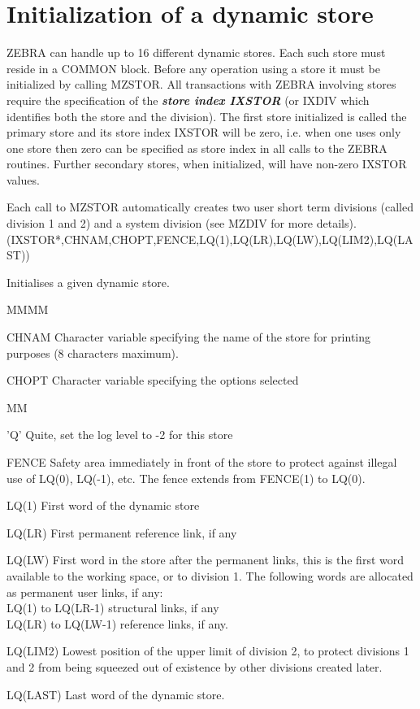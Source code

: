 \section{Initialization of a dynamic store}
\par
ZEBRA can handle up to 16 different dynamic stores. Each such store
must reside in a COMMON block.
Before any operation using a store
it must be initialized by calling MZSTOR.
All transactions with ZEBRA involving stores require the specification
of the
{\bf\it store index IXSTOR}
(or IXDIV which identifies both the store and the division).
The first store initialized is called the primary store and
its store index IXSTOR will be zero, i.e.
when one uses only one store then zero can be specified
as store index in all calls to the ZEBRA routines.
Further secondary stores, when initialized, will have
non-zero IXSTOR values.
\par Each call to MZSTOR automatically creates two user short term
divisions (called division 1 and 2) and a system division (see MZDIV
for more details).
(IXSTOR*,CHNAM,CHOPT,FENCE,LQ(1),LQ(LR),LQ(LW),LQ(LIM2),LQ(LAST))
\par Initialises a given dynamic store.
\Idesc
\begin{DL}{MMMM}
\item[CHNAM]Character variable specifying the name of the store for
printing purposes (8 characters maximum).
\item[CHOPT]Character variable specifying the options selected
\begin{DL}{MM}
\item['Q']Quite, set the log level to -2 for this store
\end{DL}
\item[FENCE]Safety area immediately in front of the store to
protect against illegal use of LQ(0), LQ(-1), etc.
The fence extends from FENCE(1) to LQ(0).
\item[LQ(1)]First word of the dynamic store
\item[LQ(LR)]First permanent reference link, if any
\item[LQ(LW)]First word in the store after the permanent links,
this is the first word available to the working
space, or to division 1. The following words are
allocated as permanent user links, if any:\\
LQ(1)  to LQ(LR-1)  structural links, if any\\
LQ(LR) to LQ(LW-1)  reference links, if any.
\item[LQ(LIM2)]Lowest position of the upper limit of division 2,
to protect divisions 1 and 2 from being squeezed out
of existence by other divisions created later.
\item[LQ(LAST)]Last word of the dynamic store.
\end{DL}
